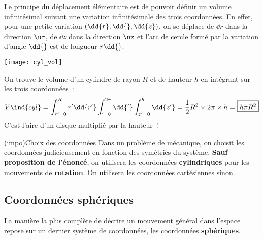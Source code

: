 \documentclass[../../main/main.tex]{subfiles}
\begin{document}
\begin{minipage}{0.70\linewidth}
	Le principe du déplacement élémentaire est de pouvoir définir un volume
	infinitésimal suivant une variation infinitésimale des trois coordonnées. En
	effet, pour une petite variation $(\dd{r}, \dd{\tt}, \dd{z})$, on se déplace
	de $\dd{r}$ dans la direction $\ur$, de $\dd{z}$ dans la direction $\uz$ et
	l'arc de cercle formé par la variation d'angle $\dd{\tt}$ est de longueur
	$r\dd{\tt}$. \bigbreak
\end{minipage}
\hfill
\begin{minipage}{0.25\linewidth}
	\begin{center}
		\texttt{[image: cyl\_vol]}
	\end{center}
\end{minipage}

On trouve le volume d'un cylindre de rayon $R$ et de hauteur $h$ en
intégrant sur les trois coordonnées~:
\[V\ind{cyl} = \int_{r'=0}^{R} r'\dd{r'} \int_{\tt'=0}^{2\pi} \dd{\tt'}
	\int_{z'=0}^{h} \dd{z'} = \frac{1}{2}R^2\times 2\pi \times h =
	\boxed{h\pi R^2}\]
C'est l'aire d'un disque multiplié par la hauteur~!

\begin{tcb*}(impo){Choix des coordonnées}
	Dans un problème de mécanique, on choisit les coordonnées judicieusement en
	fonction des symétries du système. \textbf{Sauf proposition de l'énoncé}, on
	utilisera les coordonnées \textbf{cylindriques} pour les mouvements de
	\textbf{rotation}. On utilisera les coordonnées cartésiennes sinon.
\end{tcb*}

\subsection{Coordonnées sphériques}
La manière la plus complète de décrire un mouvement général dans l'espace repose
sur un dernier système de coordonnées, les coordonnées \textbf{sphériques}.
\end{document}

